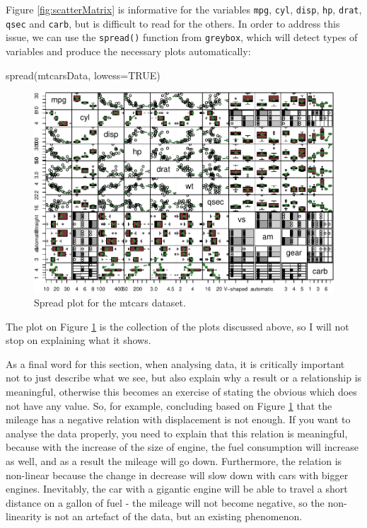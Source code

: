 \documentclass[
]{book}
\newenvironment{Shaded}{\begin{snugshade}}{\end{snugshade}}
\newcommand{\AttributeTok}[1]{\textcolor[rgb]{0.77,0.63,0.00}{#1}}
\newcommand{\ConstantTok}[1]{\textcolor[rgb]{0.00,0.00,0.00}{#1}}
\newcommand{\FunctionTok}[1]{\textcolor[rgb]{0.00,0.00,0.00}{#1}}
\newcommand{\NormalTok}[1]{#1}
\theoremstyle{definition}
\theoremstyle{definition}
\theoremstyle{definition}
\theoremstyle{definition}
\theoremstyle{remark}
\begin{document}
Figure \ref{fig:scatterMatrix} is informative for the variables \texttt{mpg}, \texttt{cyl}, \texttt{disp}, \texttt{hp}, \texttt{drat}, \texttt{qsec} and \texttt{carb}, but is difficult to read for the others. In order to address this issue, we can use the \texttt{spread()} function from \texttt{greybox}, which will detect types of variables and produce the necessary plots automatically:

\begin{Shaded}
\begin{Highlighting}[]
\FunctionTok{spread}\NormalTok{(mtcarsData, }\AttributeTok{lowess=}\ConstantTok{TRUE}\NormalTok{)}
\end{Highlighting}
\end{Shaded}

\begin{figure}
\centering
\includegraphics{Svetunkov---Statistics-for-Business-Analytics_files/figure-latex/spreadPlot-1.pdf}
\caption{\label{fig:spreadPlot}Spread plot for the mtcars dataset.}
\end{figure}

The plot on Figure \ref{fig:spreadPlot} is the collection of the plots discussed above, so I will not stop on explaining what it shows.

As a final word for this section, when analysing data, it is critically important not to just describe what we see, but also explain why a result or a relationship is meaningful, otherwise this becomes an exercise of stating the obvious which does not have any value. So, for example, concluding based on Figure \ref{fig:spreadPlot} that the mileage has a negative relation with displacement is not enough. If you want to analyse the data properly, you need to explain that this relation is meaningful, because with the increase of the size of engine, the fuel consumption will increase as well, and as a result the mileage will go down. Furthermore, the relation is non-linear because the change in decrease will slow down with cars with bigger engines. Inevitably, the car with a gigantic engine will be able to travel a short distance on a gallon of fuel - the mileage will not become negative, so the non-linearity is not an artefact of the data, but an existing phenomenon.
\end{document}
